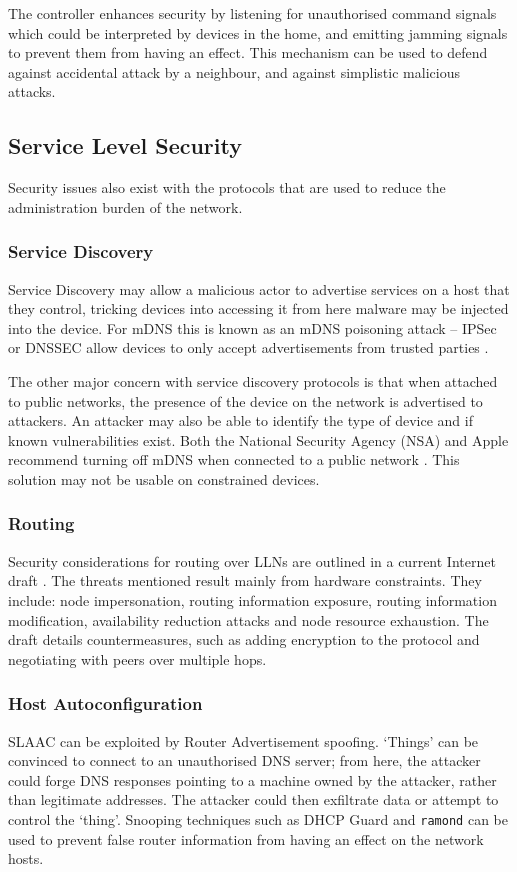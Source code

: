 \documentclass[10pt,journal,compsoc]{IEEEtran}
\begin{document}
The controller enhances security by listening for unauthorised command signals
which could be interpreted by devices in the home, and emitting jamming signals
to prevent them from having an effect. This mechanism can be used to defend
against accidental attack by a neighbour, and against simplistic malicious
attacks. 

\subsection{Service Level Security}
Security issues also exist with the protocols that are used to reduce the
administration burden of the network. 

\subsubsection{Service Discovery}
Service Discovery may allow a malicious actor to advertise services on a host
that they control, tricking devices into accessing it from here malware may be
injected into the device. For mDNS this is known as an mDNS poisoning attack --
IPSec or DNSSEC allow devices to only accept advertisements from trusted
parties \cite{Cheshire2013}. 

The other major concern with service discovery protocols is that when attached
to public networks, the presence of the device on the network is advertised to
attackers. An attacker may also be able to identify the type of device and if
known vulnerabilities exist. Both the National Security Agency (NSA) and Apple
recommend turning off mDNS when connected to a public network
\cite{NSAMacHardening} \cite{MacConfig}. This solution may not be usable on
constrained devices.

\subsubsection{Routing}
Security considerations for routing over LLNs are outlined in a current
Internet draft \cite{Tsao2014}. The threats mentioned result mainly from
hardware constraints. They include: node impersonation, routing information
exposure, routing information modification, availability reduction attacks and
node resource exhaustion. The draft details countermeasures, such as adding
encryption to the protocol and negotiating with peers over multiple hops.

\subsubsection{Host Autoconfiguration}
SLAAC can be exploited by Router Advertisement spoofing. `Things' can be
convinced to connect to an unauthorised DNS server; from here, the attacker
could forge DNS responses pointing to a machine owned by the attacker, rather
than legitimate addresses. The attacker could then exfiltrate data or attempt
to control the `thing'. Snooping techniques such as DHCP Guard and {\tt ramond}
can be used to prevent false router information from having an effect on the
network hosts.
\end{document}
